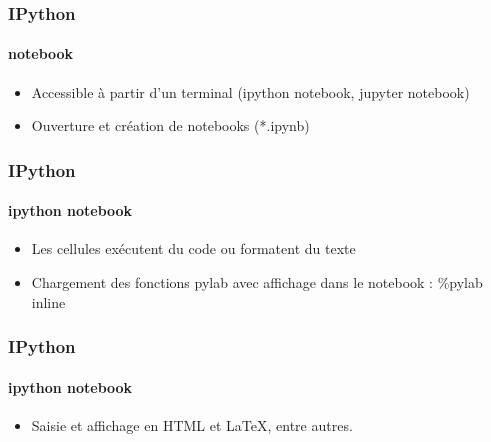 \begin{frame}[fragile]
\frametitle{IPython}
\framesubtitle{notebook}
\begin{itemize}
 \item Accessible à partir d'un terminal (ipython notebook, jupyter notebook) 
 \item Ouverture et création de notebooks (*.ipynb)
\end{itemize}
\begin{center}
\end{center}
\end{frame}
\begin{frame}[fragile]
\frametitle{IPython}
\framesubtitle{ipython notebook}
\begin{itemize}
 \item Les cellules exécutent du code ou formatent du texte
 \item Chargement des fonctions pylab avec affichage dans le notebook : \%pylab inline 
\end{itemize}
\begin{center}
\end{center}
\end{frame}
\begin{frame}[fragile]
\frametitle{IPython}
\framesubtitle{ipython notebook}
\begin{itemize}
 \item Saisie et affichage en HTML et LaTeX, entre autres.   
\end{itemize}
\begin{center}
\end{center}
\end{frame}
